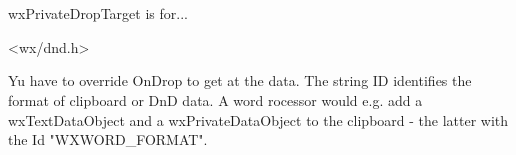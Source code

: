 \section{}\label{wxprivatedroptarget}

wxPrivateDropTarget is for...




<wx/dnd.h>




\label{wxprivatedroptargetwxprivatedroptarget}


\label{wxprivatedroptargetsetid}


Yu have to override OnDrop to get at the data.
The string ID identifies the format of clipboard or DnD data. A word
rocessor would e.g. add a wxTextDataObject and a wxPrivateDataObject
to the clipboard - the latter with the Id "WXWORD\_FORMAT".

\label{wxprivatedroptargetgetid}


